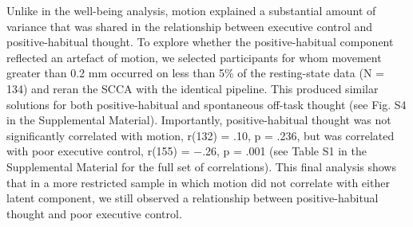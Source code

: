 Unlike in the well-being analysis, motion explained a substantial amount of variance that was shared in the relationship between executive control and positive-habitual thought. To explore whether the positive-habitual component reflected an artefact of motion, we selected participants for whom movement greater than 0.2 mm occurred on less than 5\% of the resting-state data (N = 134) and reran the SCCA with the identical pipeline. This produced similar solutions for both positive-habitual and spontaneous off-task thought (see Fig. S4 in the Supplemental Material). Importantly, positive-habitual thought was not significantly correlated with motion, r(132) = .10, p = .236, but was correlated with poor executive control, r(155) = −.26, p = .001 (see Table S1 in the Supplemental Material for the full set of correlations). This final analysis shows that in a more restricted sample in which motion did not correlate with either latent component, we still observed a relationship between positive-habitual thought and poor executive control.

